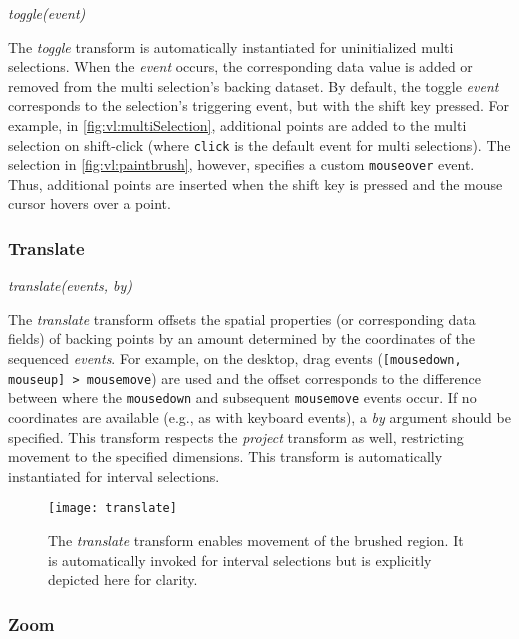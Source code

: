 \vspace{-7pt}

\centerline{\emph{toggle(event)}}

The \emph{toggle} transform is automatically instantiated for uninitialized
multi selections. When the \emph{event} occurs, the corresponding data value is
added or removed from the multi selection's backing dataset. By default, the
toggle \emph{event} corresponds to the selection's triggering event, but with
the shift key pressed. For example, in \cref{fig:vl:multiSelection}, additional
points are added to the multi selection on shift-click (where \texttt{click} is
the default event for multi selections). The selection in \cref{fig:vl:paintbrush},
however, specifies a custom \texttt{mouseover} event. Thus, additional points
are inserted when the shift key is pressed and the mouse cursor hovers over a
point.

\vspace{-10pt}

\subsubsection{Translate}

\vspace{-7pt}

\centerline{\emph{translate(events, by)}}

The \emph{translate} transform offsets the spatial properties (or corresponding
data fields) of backing points by an amount determined by the coordinates of the
sequenced \emph{events}. For example, on the desktop, drag events
(\texttt{[mousedown, mouseup] > mousemove}) are used and the offset corresponds
to the difference between where the \texttt{mousedown} and subsequent
\texttt{mousemove} events occur. If no coordinates are available (e.g., as with
keyboard events), a \emph{by} argument should be specified. This transform
respects the \emph{project} transform as well, restricting movement to the
specified dimensions. This transform is automatically instantiated for interval
selections.

\begin{figure}[h!]
  \centering
  \texttt{[image: translate]}
  \caption{The \emph{translate} transform enables movement of the brushed
  region. It is automatically invoked for interval selections but is
  explicitly depicted here for clarity.}
  \label{fig:vl:translate}
\end{figure}

\subsubsection{Zoom}

